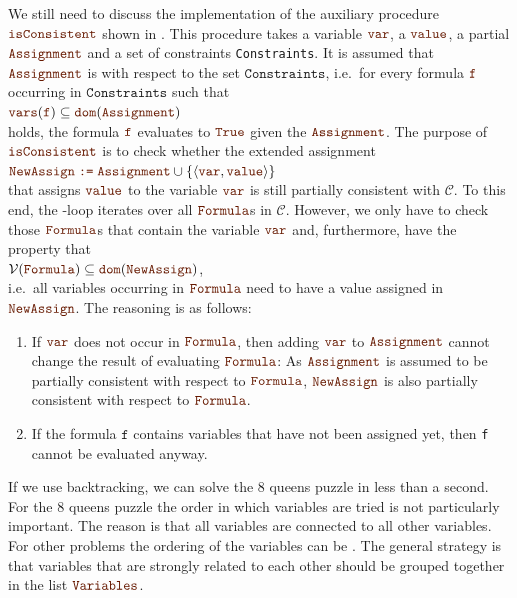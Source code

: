 We still need to discuss the implementation of the auxiliary procedure $\mytt{isConsistent}$
shown in .  This procedure takes a variable $\mytt{var}$, a $\mytt{value}$, a partial 
$\mytt{Assignment}$ and a set of constraints \texttt{Constraints}.  It is assumed that $\mytt{Assignment}$ is
 with respect to the set $\mathtt{Constraints}$, i.e.~for every formula $\mytt{f}$
occurring in $\mathtt{Constraints}$ such that
\\[0.2cm]
\hspace*{1.3cm}
$\mytt{vars}(\mytt{f}) \subseteq \mytt{dom}(\mytt{Assignment})$
\\[0.2cm]
holds, the formula $\mytt{f}$ evaluates to $\mytt{True}$ given the $\mytt{Assignment}$.  The purpose of
$\mytt{isConsistent}$ is to check whether the extended assignment
\\[0.2cm]
\hspace*{1.3cm}
$\mytt{NewAssign} \;\mytt{:=}\;\mytt{Assignment} \cup \{ \pair(\mytt{var}, \mytt{value}) \}$
\\[0.2cm]
that assigns $\mytt{value}$ to the variable $\mytt{var}$ is still partially consistent with $\mathcal{C}$. 
To this end, the -loop iterates over all $\mytt{Formula}$s in $\mathcal{C}$. 
However, we only have to check those $\mytt{Formula}$s that contain the variable $\mytt{var}$ and,
furthermore, have the property that
\\[0.2cm]
\hspace*{1.3cm}
$\mathcal{V}(\mytt{Formula}) \subseteq \mytt{dom}(\mytt{NewAssign})$,
\\[0.2cm]
i.e.~all variables occurring in $\mytt{Formula}$ need to have a value assigned in
$\mytt{NewAssign}$.  The reasoning is as follows:
\begin{enumerate}
\item If $\mytt{var}$ does not occur in $\mytt{Formula}$, then adding $\mytt{var}$ to
      $\mytt{Assignment}$ cannot change the result of evaluating $\mytt{Formula}$: As
      $\mytt{Assignment}$ is assumed to be partially consistent with respect to $\mytt{Formula}$, 
      $\mytt{NewAssign}$ is also partially consistent with respect to $\mytt{Formula}$.
\item If the formula $\mathtt{f}$ contains variables that have not been assigned yet, then \texttt{f} cannot
      be evaluated anyway.
\end{enumerate}
If we use backtracking, we can solve the 8 queens puzzle in less than a second.
For the 8 queens puzzle the order in which variables are tried is not particularly important.  The reason
is that all variables are connected to all other variables.  For other problems the ordering of the variables
can be .  The general strategy is that variables that are strongly related to each other should
be grouped together in the list $\mytt{Variables}$.

